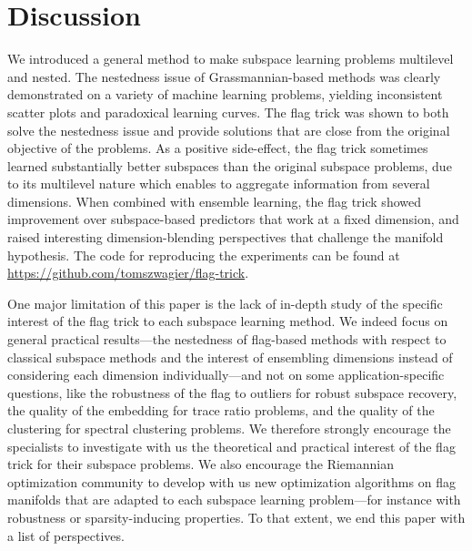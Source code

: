 \section{Discussion}\label{sec:discussion}

We introduced a general method to make subspace learning problems multilevel and nested.
The nestedness issue of Grassmannian-based methods was clearly demonstrated on a variety of machine learning problems, yielding inconsistent scatter plots and paradoxical learning curves. The flag trick was shown to both solve the nestedness issue and provide solutions that are close from the original objective of the problems. As a positive side-effect, the flag trick sometimes learned substantially better subspaces than the original subspace problems, due to its multilevel nature which enables to aggregate information from several dimensions.
When combined with ensemble learning, the flag trick showed improvement over subspace-based predictors that work at a fixed dimension, and raised interesting dimension-blending perspectives that challenge the manifold hypothesis. 
The code for reproducing the experiments can be found at \url{https://github.com/tomszwagier/flag-trick}.

One major limitation of this paper is the lack of in-depth study of the specific interest of the flag trick to each subspace learning method. We indeed focus on general practical results---the nestedness of flag-based methods with respect to classical subspace methods and the interest of ensembling dimensions instead of considering each dimension individually---and not on some application-specific questions, like the robustness of the flag to outliers for robust subspace recovery, the quality of the embedding for trace ratio problems, and the quality of the clustering for spectral clustering problems. We therefore strongly encourage the specialists to investigate with us the theoretical and practical interest of the flag trick for their subspace problems.
We also encourage the Riemannian optimization community to develop with us new optimization algorithms on flag manifolds that are adapted to each subspace learning problem---for instance with robustness or sparsity-inducing properties.
To that extent, we end this paper with a list of perspectives.

